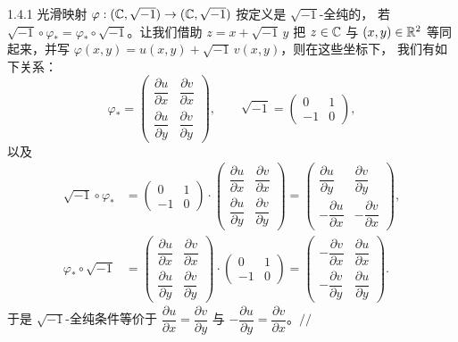 \begin{wexam}{1.4.1}
光滑映射 $\varphi:(\mathbb{C},\sqrt{-1})\to(\mathbb{C},\sqrt{-1})$ 按定义是 $\sqrt{-1}$-全纯的，
若 $\sqrt{-1}\circ\varphi_*=\varphi_*\circ\sqrt{-1}$。让我们借助 $z=x+\sqrt{-1}\,y$ 把 $z\in\mathbb{C}$
与 $(x,y)\in\mathbb{R}^2$ 等同起来，并写 $\varphi(x,y)=u(x,y)+\sqrt{-1}\,v(x,y)$，则在这些坐标下，
我们有如下关系：
\[
  \varphi_*=\begin{pmatrix}
    \dfrac{\partial u}{\partial x} & \dfrac{\partial v}{\partial x}\\[2mm]
    \dfrac{\partial u}{\partial y} & \dfrac{\partial v}{\partial y}
  \end{pmatrix},
  \qquad
  \sqrt{-1}=\begin{pmatrix}0&1\\-1&0\end{pmatrix},
\]
以及
\[
  \begin{aligned}
    \sqrt{-1}\circ\varphi_*
    &=\begin{pmatrix}0&1\\-1&0\end{pmatrix}
      \cdot\begin{pmatrix}
        \dfrac{\partial u}{\partial x} & \dfrac{\partial v}{\partial x}\\[2mm]
        \dfrac{\partial u}{\partial y} & \dfrac{\partial v}{\partial y}
      \end{pmatrix}
     =\begin{pmatrix}
        \dfrac{\partial u}{\partial y} & \dfrac{\partial v}{\partial y}\\[2mm]
        -\dfrac{\partial u}{\partial x} & -\dfrac{\partial v}{\partial x}
      \end{pmatrix},\\
    \varphi_*\circ\sqrt{-1}
    &=\begin{pmatrix}
        \dfrac{\partial u}{\partial x} & \dfrac{\partial v}{\partial x}\\[2mm]
        \dfrac{\partial u}{\partial y} & \dfrac{\partial v}{\partial y}
      \end{pmatrix}
      \cdot\begin{pmatrix}0&1\\-1&0\end{pmatrix}
     =\begin{pmatrix}
        -\dfrac{\partial v}{\partial x} & \dfrac{\partial u}{\partial x}\\[2mm]
        -\dfrac{\partial v}{\partial y} & \dfrac{\partial u}{\partial y}
      \end{pmatrix}.
  \end{aligned}
\]
于是 $\sqrt{-1}$-全纯条件等价于
$\dfrac{\partial u}{\partial x}=\dfrac{\partial v}{\partial y}$ 与
$-\dfrac{\partial u}{\partial y}=\dfrac{\partial v}{\partial x}$。\hfill$//$
\end{wexam}
